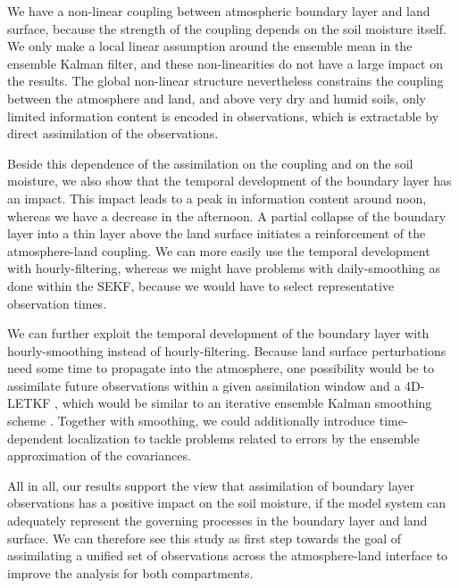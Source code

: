 \documentclass[hess, manuscript]{copernicus}
\begin{document}
We have a non-linear coupling between atmospheric boundary layer and land surface, because the strength of the coupling depends on the soil moisture itself.
We only make a local linear assumption around the ensemble mean in the ensemble Kalman filter, and these non-linearities do not have a large impact on the results.
The global non-linear structure nevertheless constrains the coupling between the atmosphere and land, and above very dry and humid soils, only limited information content is encoded in observations, which is extractable by direct assimilation of the observations.

Beside this dependence of the assimilation on the coupling and on the soil moisture, we also show that the temporal development of the boundary layer has an impact.
This impact leads to a peak in information content around noon, whereas we have a decrease in the afternoon.
A partial collapse of the boundary layer into a thin layer above the land surface initiates a reinforcement of the atmosphere-land coupling.
We can more easily use the temporal development with hourly-filtering, whereas we might have problems with daily-smoothing as done within the SEKF, because we would have to select representative observation times.

We can further exploit the temporal development of the boundary layer with hourly-smoothing instead of hourly-filtering.
Because land surface perturbations need some time to propagate into the atmosphere, one possibility would be to assimilate future observations within a given assimilation window and a 4D-LETKF \citep{harlim_four-dimensional_2007,kalnay_response_2007}, which would be similar to an iterative ensemble Kalman smoothing scheme \citep{kalnay_accelerating_2010, sakov_iterative_2012,bocquet_iterative_2014}.
Together with smoothing, we could additionally introduce time-dependent localization to tackle problems related to errors by the ensemble approximation of the covariances.

All in all, our results support the view that assimilation of boundary layer observations has a positive impact on the soil moisture, if the model system can adequately represent the governing processes in the boundary layer and land surface.
We can therefore see this study as first step towards the goal of assimilating a unified set of observations across the atmosphere-land interface to improve the analysis for both compartments.
\end{document}
